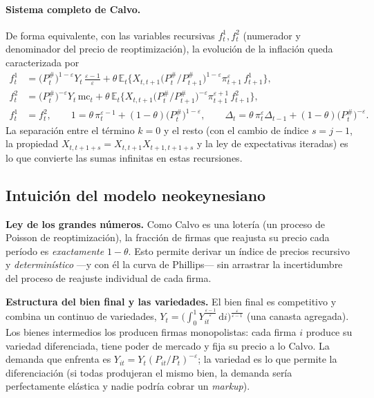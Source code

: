 \documentclass[11pt]{article}
\theoremstyle{definition}
\newcommand{\E}{\mathbb{E}}
\newcommand{\dd}{\,\mathrm{d}}
\newcommand{\mc}{\mathrm{mc}}
\begin{document}
\paragraph{Sistema completo de Calvo.} De forma equivalente, con las variables recursivas
$f^{1}_{t},f^{2}_{t}$ (numerador y denominador del precio de reoptimización), la evolución de la inflación queda caracterizada por
\begin{align}
f^{1}_{t}&=\big(P_{t}^{\#}\big)^{1-\varepsilon}Y_{t}\,\frac{\varepsilon-1}{\varepsilon}
+\theta\,\E_{t}\Big\{X_{t,t+1}\big(P_{t}^{\#}/P_{t+1}^{\#}\big)^{1-\varepsilon}\pi_{t+1}^{\varepsilon}\,f^{1}_{t+1}\Big\},\\
f^{2}_{t}&=\big(P_{t}^{\#}\big)^{-\varepsilon}Y_{t}\,\mc_{t}
+\theta\,\E_{t}\Big\{X_{t,t+1}\big(P_{t}^{\#}/P_{t+1}^{\#}\big)^{-\varepsilon}\pi_{t+1}^{\varepsilon+1}\,f^{2}_{t+1}\Big\},\\
f^{1}_{t}&=f^{2}_{t},\qquad
1=\theta\,\pi_{t}^{\varepsilon-1}+(1-\theta)\big(P_{t}^{\#}\big)^{1-\varepsilon},\qquad
\Delta_{t}=\theta\,\pi_{t}^{\varepsilon}\Delta_{t-1}+(1-\theta)\big(P_{t}^{\#}\big)^{-\varepsilon}.
\end{align}
La separación entre el término $k=0$ y el resto (con el cambio de índice $s=j-1$, la propiedad
$X_{t,t+1+s}=X_{t,t+1}X_{t+1,t+1+s}$ y la ley de expectativas iteradas) es lo que convierte las sumas
infinitas en estas recursiones.

\subsection{Intuición del modelo neokeynesiano}

\textbf{Ley de los grandes números.} Como Calvo es una lotería (un proceso de Poisson de
reoptimización), la fracción de firmas que reajusta su precio cada período es \emph{exactamente}
$1-\theta$. Esto permite derivar un índice de precios recursivo y \emph{determinístico} ---y con él la
curva de Phillips--- sin arrastrar la incertidumbre del proceso de reajuste individual de cada firma.

\textbf{Estructura del bien final y las variedades.} El bien final es competitivo y combina un continuo
de variedades, $Y_{t}=\big(\int_{0}^{1}Y_{it}^{\frac{\varepsilon-1}{\varepsilon}}\dd i\big)^{\frac{\varepsilon}{\varepsilon-1}}$
(una canasta agregada). Los bienes intermedios los producen firmas monopolistas: cada firma $i$ produce
su variedad diferenciada, tiene poder de mercado y fija su precio a lo Calvo. La demanda que enfrenta
es $Y_{it}=Y_{t}(P_{it}/P_{t})^{-\varepsilon}$; la variedad es lo que permite la diferenciación (si
todas produjeran el mismo bien, la demanda sería perfectamente elástica y nadie podría cobrar un
\emph{markup}).
\end{document}
